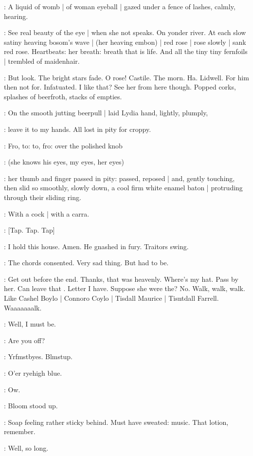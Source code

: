 :
A liquid of womb |
of woman eyeball |
gazed under a fence of lashes,
calmly,
hearing.

\BloomInt:
See real beauty of the eye |
when she not speaks.
On yonder river.
At each slow satiny heaving bosom's wave |
(her heaving embon) |
red rose |
rose slowly |
sank red rose.
Heartbeats:
her breath:
breath that is life.
And all the tiny tiny fernfoils |
trembled of maidenhair.

\BloomInt:
But look.
The bright stars fade.
O rose!
Castile.
The morn.
Ha.
Lidwell.
For him then not for.
Infatuated.
I like that?
See her from here though.
Popped corks,
splashes of beerfroth,
stacks of empties.

:
On the smooth jutting beerpull |
laid Lydia hand,
lightly,
plumply,

\BloomInt:
leave it to my hands.
All lost in pity for croppy.

:
Fro,
to:
to,
fro:
over the polished knob

\BloomInt:
(she knows his eyes,
my eyes,
her eyes)

:
her thumb and finger passed in pity:
passed,
reposed |
and, gently touching,
then slid so smoothly,
slowly down,
a cool firm white enamel baton |
protruding through their sliding ring.

\BloomInt:
With a cock |
with a carra.

\stripling:
[Tap.
Tap.
Tap]

:
I hold this house.
Amen.
He gnashed in fury.
Traitors swing.

:
The chords consented.
Very sad thing.
But had to be.

\BloomInt:
Get out before the end.
Thanks,
that was heavenly.
Where's my hat.
Pass by her.
Can leave that .
Letter I have.
Suppose she were the?
No.
Walk,
walk,
walk.
Like Cashel Boylo |
Connoro Coylo |
Tisdall Maurice |
Tisntdall Farrell.
Waaaaaaalk.

\Bloom:
Well,
I must be.

\goulding:
Are you off?

\Bloom:
Yrfmstbyes.
Blmstup.

\goulding:
O'er ryehigh blue.

\BloomInt:
Ow.

:
Bloom stood up.

\BloomInt:
Soap feeling rather sticky behind.
Must have sweated:
music.
That lotion,
remember.

\Bloom:
Well,
so long.

